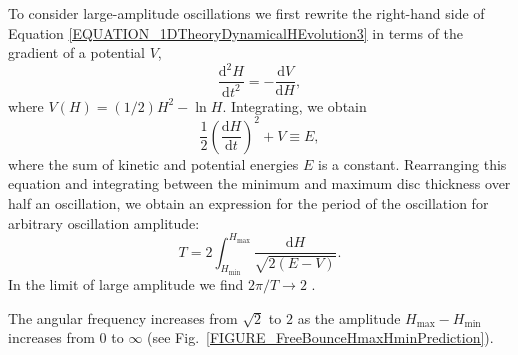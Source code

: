 \documentclass[fleqn,usenatbib]{mnras}
\newcommand{\dd}{\mathrm{d}}
\begin{document}
To consider large-amplitude oscillations we first rewrite the right-hand side of Equation \ref{EQUATION_1DTheoryDynamicalHEvolution3} in terms of the gradient of a potential $V$,
\begin{equation}
    \frac{\dd^2 H}{\dd t^2} = -\frac{\dd V}{\dd H},
    \label{EQUATION_1DTheoryDynamicalHEvolution3Linearized}
\end{equation}
where $V(H) = (1/2)H^2 - \ln H$. Integrating, we obtain
\begin{equation}
\frac{1}{2}\left(\frac{\dd H}{\dd t}\right)^2 + V \equiv E,
\end{equation}
where the sum of kinetic and potential energies $E$ is a constant. Rearranging this equation and integrating between the minimum and maximum disc thickness over half an oscillation, we obtain an expression for the period of the oscillation for arbitrary oscillation amplitude:
\begin{equation}
    T = 2\int_{H_\text{min}}^{H_\text{max}} \frac{\dd H}{\sqrt{2(E-V)}}.
    \label{EQUATION_1DTheoryOscillationPeriod}
\end{equation}
In the limit of large amplitude we find $2\pi / T \rightarrow 2$ \citep{fairbairn2021non}.

The angular frequency increases from $\sqrt{2}$ to $2$ as the amplitude $H_\text{max}-H_\text{min}$ increases from $0$ to $\infty$ (see Fig.~\ref{FIGURE_FreeBounceHmaxHminPrediction}).
\end{document}
